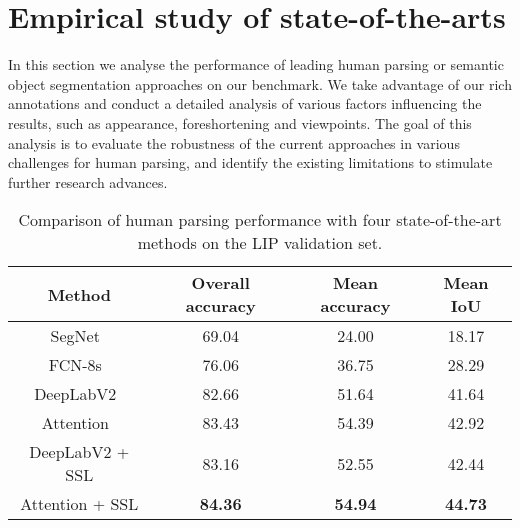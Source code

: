 \documentclass[10pt,twocolumn,letterpaper]{article}
\begin{document}
\section{Empirical study of state-of-the-arts}
In this section we analyse the performance of leading human parsing or semantic object segmentation approaches on our benchmark. We take advantage of our rich annotations and conduct a detailed analysis of various factors influencing the results, such as appearance, foreshortening and viewpoints. The goal of this analysis is to evaluate the robustness of the current approaches in various challenges for human parsing, and identify the existing limitations to stimulate further research advances.

\begin{table}[]
\centering
\scriptsize
\begin{tabular}{cccc}
\toprule[0.7pt]
   Method                                 & Overall accuracy    & Mean accuracy     & Mean IoU  \\ \hline 
   SegNet~\cite{badrinarayanan2015segnet}       & 69.04            & 24.00           & 18.17    \\
   FCN-8s~\cite{long2014fully}                  & 76.06            & 36.75           & 28.29    \\
   DeepLabV2~\cite{chen2014semantic}     & 82.66            & 51.64           & 41.64     \\
   Attention~\cite{chen2015attention}  & 83.43            & 54.39           & 42.92     \\ \hline
   DeepLabV2 + SSL                       & 83.16            & 52.55           & 42.44     \\
   Attention + SSL                     & \textbf{84.36}   & \textbf{54.94}  & \textbf{44.73}    \\
\toprule[0.7pt]
\end{tabular}
\vspace{-4mm}
\caption{Comparison of human parsing performance with four state-of-the-art methods on the LIP validation set.}
\vspace{-4mm}
\label{tab: lip_val}
\end{table}
\end{document}
